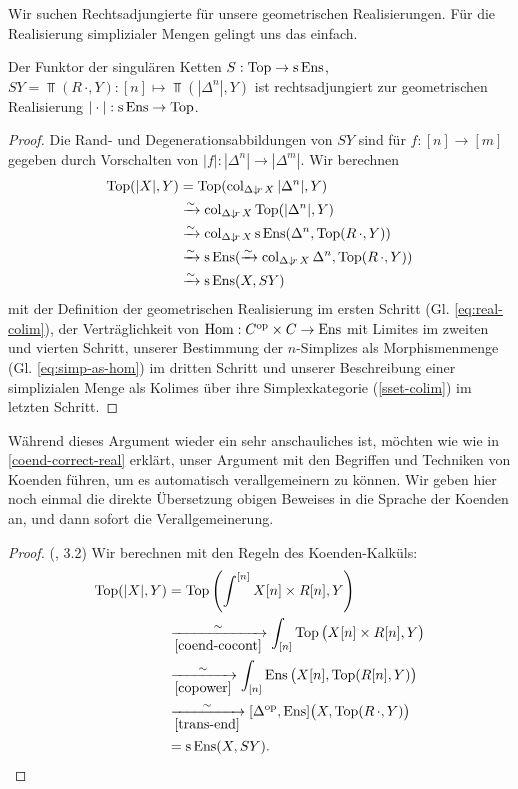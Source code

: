 Wir suchen Rechtsadjungierte für unsere geometrischen
Realisierungen. Für die Realisierung simplizialer Mengen gelingt uns
das einfach.
\begin{satz}
  Der Funktor der singulären Ketten $S: \operatorname{Top} \to \operatorname{s}\operatorname{Ens}$, $SY
  = \Top(R \, \cdot, Y): [n] \mapsto \Top(|\Delta^n|, Y)$ ist
  rechtsadjungiert zur geometrischen Realisierung
  $|\cdot|: \operatorname{s}\operatorname{Ens} \to \operatorname{Top}$.
\end{satz}
\begin{proof}
  Die Rand- und Degenerationsabbildungen von $SY$ sind für $f: [n] \to
  [m]$ gegeben durch Vorschalten von $|f|: |\Delta^n| \to
  |\Delta^m|$. Wir berechnen
  \begin{align*}
    \operatorname{Top}(|X|, Y)
    & = \operatorname{Top}(\operatorname{col}_{\Delta \downarrow \! {\scriptstyle r} \, X} |\Delta^n|, Y) \\
    & \xrightarrow[]{\sim} \operatorname{col}_{\Delta \downarrow \! {\scriptstyle r} \, X} \operatorname{Top}(|\Delta^n|, Y) \\
    & \xrightarrow[]{\sim} \operatorname{col}_{\Delta \downarrow \! {\scriptstyle r} \, X} \operatorname{s}\operatorname{Ens}(\Delta^n, \operatorname{Top}(R \, \cdot, Y)) \\
    & \xrightarrow[]{\sim} \operatorname{s}\operatorname{Ens}(\xrightarrow[]{\sim} \operatorname{col}_{\Delta \downarrow \! {\scriptstyle r} \, X} \Delta^n, \operatorname{Top}(R \, \cdot, Y)) \\
    & \xrightarrow[]{\sim} \operatorname{s}\operatorname{Ens}(X, SY)
  \end{align*}  
  mit der Definition der geometrischen Realisierung im ersten Schritt
  (Gl. \ref{eq:real-colim}), der Verträglichkeit von $\operatorname{Hom}:
  C^\mathrm{op} \times C \to \operatorname{Ens}$ mit Limites im zweiten und vierten Schritt,
  unserer Bestimmung der $n$-Simplizes als Morphismenmenge
  (Gl. \ref{eq:simp-as-hom}) im dritten Schritt und unserer
  Beschreibung einer simplizialen Menge als Kolimes über ihre
  Simplexkategorie (\ref{sset-colim}) im letzten Schritt.
\end{proof}
Während dieses Argument wieder ein sehr anschauliches ist, möchten wie
wie in \ref{coend-correct-real} erklärt, unser Argument mit den
Begriffen und Techniken von Koenden führen, um es automatisch
verallgemeinern zu können. Wir geben hier noch einmal die direkte
Übersetzung obigen Beweises in die Sprache der Koenden an, und dann
sofort die Verallgemeinerung.
\begin{proof} (\cite{Lore}, 3.2)
  Wir berechnen mit den Regeln des Koenden-Kalküls:
  \begin{align*}
     \operatorname{Top}(|X|, Y)
     &= \operatorname{Top} \left( \int^{[n]} X[n] \times R[n], Y \right) \\
     & \xrightarrow[\ref{coend-cocont}]{\sim}
       \int_{[n]} \operatorname{Top} \big( X[n] \times R[n], Y \big) \\
     & \xrightarrow[\ref{copower}]{\sim}
       \int_{[n]} \operatorname{Ens} \big( X[n], \operatorname{Top}(R[n], Y) \big) \\
     & \xrightarrow[\ref{trans-end}]{\sim}
       [\Delta^\mathrm{op}, \operatorname{Ens}] \big( X, \operatorname{Top}(R \, \cdot, Y) \big) \\
     &= \operatorname{s}\operatorname{Ens}(X, SY).
  \end{align*}
\end{proof}

